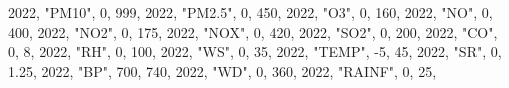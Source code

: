 \documentclass[
  letterpaper,
  DIV=11,
  numbers=noendperiod]{scrartcl}
\newenvironment{Shaded}{\begin{snugshade}}{\end{snugshade}}
\newcommand{\DecValTok}[1]{\textcolor[rgb]{0.68,0.00,0.00}{#1}}
\newcommand{\FloatTok}[1]{\textcolor[rgb]{0.68,0.00,0.00}{#1}}
\newcommand{\NormalTok}[1]{\textcolor[rgb]{0.00,0.23,0.31}{#1}}
\newcommand{\SpecialCharTok}[1]{\textcolor[rgb]{0.37,0.37,0.37}{#1}}
\newcommand{\StringTok}[1]{\textcolor[rgb]{0.13,0.47,0.30}{#1}}
\begin{document}
\begin{Shaded}
\begin{Highlighting}[]
  \DecValTok{2022}\NormalTok{, }\StringTok{"PM10"}\NormalTok{, }\DecValTok{0}\NormalTok{, }\DecValTok{999}\NormalTok{,}
  \DecValTok{2022}\NormalTok{, }\StringTok{"PM2.5"}\NormalTok{, }\DecValTok{0}\NormalTok{, }\DecValTok{450}\NormalTok{,}
  \DecValTok{2022}\NormalTok{, }\StringTok{"O3"}\NormalTok{, }\DecValTok{0}\NormalTok{, }\DecValTok{160}\NormalTok{,}
  \DecValTok{2022}\NormalTok{, }\StringTok{"NO"}\NormalTok{, }\DecValTok{0}\NormalTok{, }\DecValTok{400}\NormalTok{,}
  \DecValTok{2022}\NormalTok{, }\StringTok{"NO2"}\NormalTok{, }\DecValTok{0}\NormalTok{, }\DecValTok{175}\NormalTok{,}
  \DecValTok{2022}\NormalTok{, }\StringTok{"NOX"}\NormalTok{, }\DecValTok{0}\NormalTok{, }\DecValTok{420}\NormalTok{,}
  \DecValTok{2022}\NormalTok{, }\StringTok{"SO2"}\NormalTok{, }\DecValTok{0}\NormalTok{, }\DecValTok{200}\NormalTok{,}
  \DecValTok{2022}\NormalTok{, }\StringTok{"CO"}\NormalTok{, }\DecValTok{0}\NormalTok{, }\DecValTok{8}\NormalTok{,}
  \DecValTok{2022}\NormalTok{, }\StringTok{"RH"}\NormalTok{, }\DecValTok{0}\NormalTok{, }\DecValTok{100}\NormalTok{,}
  \DecValTok{2022}\NormalTok{, }\StringTok{"WS"}\NormalTok{, }\DecValTok{0}\NormalTok{, }\DecValTok{35}\NormalTok{,}
  \DecValTok{2022}\NormalTok{, }\StringTok{"TEMP"}\NormalTok{, }\SpecialCharTok{{-}}\DecValTok{5}\NormalTok{, }\DecValTok{45}\NormalTok{,}
  \DecValTok{2022}\NormalTok{, }\StringTok{"SR"}\NormalTok{, }\DecValTok{0}\NormalTok{, }\FloatTok{1.25}\NormalTok{,}
  \DecValTok{2022}\NormalTok{, }\StringTok{"BP"}\NormalTok{, }\DecValTok{700}\NormalTok{, }\DecValTok{740}\NormalTok{,}
  \DecValTok{2022}\NormalTok{, }\StringTok{"WD"}\NormalTok{, }\DecValTok{0}\NormalTok{, }\DecValTok{360}\NormalTok{,}
  \DecValTok{2022}\NormalTok{, }\StringTok{"RAINF"}\NormalTok{, }\DecValTok{0}\NormalTok{, }\DecValTok{25}\NormalTok{,}


\end{Highlighting}
\end{Shaded}
\end{document}
